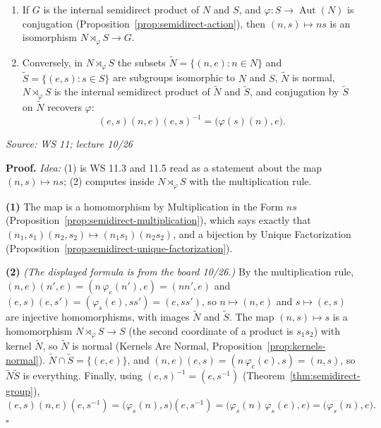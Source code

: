 \documentclass[11pt]{report}
\renewenvironment{proof}[1][Proof]{\noindent\textbf{#1.} }{\hfill$\square$\par\vspace{5pt}}
\newcommand{\srcline}[1]{\par\hfill{\footnotesize\textit{Source: #1}}}
\begin{document}
\begin{thmbox}\label{thm:internal-external-semidirect}
\begin{enumerate}
    \item If $G$ is the internal semidirect product of $N$ and $S$, and $\varphi: S \to \operatorname{Aut}(N)$ is conjugation (Proposition~\ref{prop:semidirect-action}), then $(n, s) \mapsto ns$ is an isomorphism $N \rtimes_\varphi S \to G$.
    \item Conversely, in $N \rtimes_\varphi S$ the subsets $\tilde N = \{(n, e) : n \in N\}$ and $\tilde S = \{(e, s) : s \in S\}$ are subgroups isomorphic to $N$ and $S$, $\tilde N$ is normal, $N \rtimes_\varphi S$ is the internal semidirect product of $\tilde N$ and $\tilde S$, and conjugation by $\tilde S$ on $\tilde N$ recovers $\varphi$:
    \[ (e, s)(n, e)(e, s)^{-1} = \big(\varphi(s)(n), e\big). \]
\end{enumerate}
\srcline{WS 11; lecture 10/26}
\end{thmbox}

\begin{proof}
\textit{Idea:} (1) is WS 11.3 and 11.5 read as a statement about the map $(n, s) \mapsto ns$; (2) computes inside $N \rtimes_\varphi S$ with the multiplication rule.\par
\textbf{(1)} The map is a homomorphism by Multiplication in the Form $ns$ (Proposition~\ref{prop:semidirect-multiplication}), which says exactly that $(n_1, s_1)(n_2, s_2) \mapsto (n_1s_1)(n_2s_2)$, and a bijection by Unique Factorization (Proposition~\ref{prop:semidirect-unique-factorization}).

\textbf{(2)} \textit{(The displayed formula is from the board 10/26.)} By the multiplication rule, $(n, e)(n', e) = (n\,\varphi_e(n'), e) = (nn', e)$ and $(e, s)(e, s') = (\varphi_s(e), ss') = (e, ss')$, so $n \mapsto (n, e)$ and $s \mapsto (e, s)$ are injective homomorphisms, with images $\tilde N$ and $\tilde S$. The map $(n, s) \mapsto s$ is a homomorphism $N \rtimes_\varphi S \to S$ (the second coordinate of a product is $s_1s_2$) with kernel $\tilde N$, so $\tilde N$ is normal (Kernels Are Normal, Proposition~\ref{prop:kernels-normal}). $\tilde N \cap \tilde S = \{(e, e)\}$, and $(n, e)(e, s) = (n\,\varphi_e(e), s) = (n, s)$, so $\tilde N\tilde S$ is everything. Finally, using $(e, s)^{-1} = (e, s^{-1})$ (Theorem~\ref{thm:semidirect-group}),
\[ (e, s)(n, e)(e, s^{-1}) = \big(\varphi_s(n), s\big)(e, s^{-1}) = \big(\varphi_s(n)\,\varphi_s(e), e\big) = \big(\varphi_s(n), e\big). \]
\end{proof}
\end{document}
